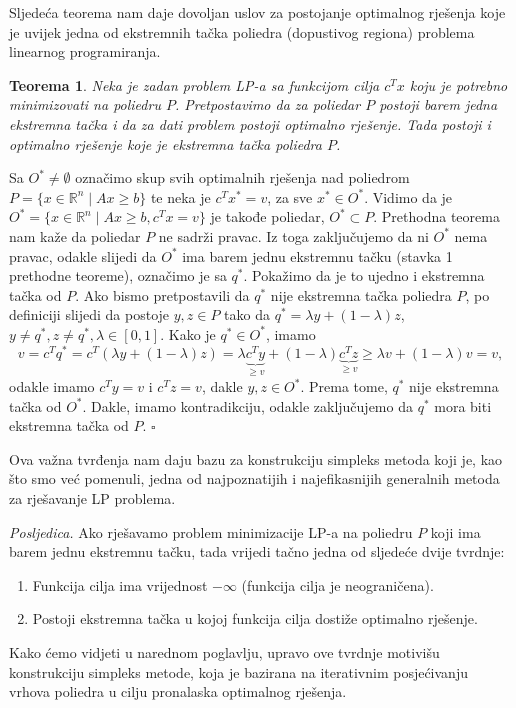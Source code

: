\documentclass[a4paper, utf8, 11pt, colorlinks]{book}
\newtheorem{thm}{Teorema}
\newenvironment{proof}{{Dokaz:}}{\hfill$\square$}
\begin{document}
Sljedeća teorema nam daje dovoljan uslov za postojanje optimalnog rješenja koje je uvijek jedna od ekstremnih tačka poliedra (dopustivog regiona) problema linearnog programiranja.

\begin{thm}
   Neka je zadan problem LP-a sa funkcijom cilja $c^Tx$ koju je potrebno minimizovati na poliedru $P$. Pretpostavimo da za poliedar $P$ postoji barem jedna ekstremna tačka i da za dati problem postoji optimalno rješenje. Tada postoji i optimalno rješenje koje je ekstremna tačka poliedra $P$.
\end{thm}

\begin{proof}
         Sa $O^* \not = \emptyset$ označimo skup svih optimalnih rješenja  nad poliedrom $P= \{ x \in \mathbb{R}^n \mid A x \geq b \}$ te neka je $c^T x^* = v$, za sve $x^* \in O^*$. Vidimo da je 
         $O^* = \{ x \in \mathbb{R}^n \mid A x \geq b, c^T x = v  \}$ je takođe poliedar, $O^* \subset P$. Prethodna teorema nam kaže da poliedar $P$ ne sadrži pravac. Iz toga zaključujemo da ni $O^*$ nema pravac, odakle slijedi da $O^*$ ima barem jednu ekstremnu tačku (stavka 1 prethodne teoreme), označimo je sa $q^*$. Pokažimo da je to ujedno i ekstremna tačka od $P$.  Ako bismo pretpostavili da $q^*$ nije ekstremna tačka poliedra $P$, po definiciji slijedi da postoje $y, z \in P$ tako da $q^* = \lambda y + ( 1 - \lambda ) z $, $y \neq q^*, z \neq q^*, \lambda \in [0, 1]$. Kako je $q^* \in O^*$, imamo 
         $$ v = c^T q^* = c^T (  \lambda y + ( 1 - \lambda ) z ) = \lambda 
        \underbrace{ c^T y}_{ \geq v} + ( 1 - \lambda ) \underbrace{c^T z}_{\geq v} \geq \lambda v + (1 - \lambda) v = v,$$
        odakle imamo $c^T y = v$ i $c^T z = v$, dakle $y, z \in O^*$. Prema tome, $q^*$ nije ekstremna tačka od $O^*$. Dakle, imamo kontradikciju, odakle zaključujemo da $q^*$ mora biti  ekstremna tačka od  $P$.
\end{proof}
 
 Ova važna tvrđenja nam daju bazu za konstrukciju simpleks metoda koji je, kao što smo već pomenuli, jedna od najpoznatijih i najefikasnijih generalnih metoda za rješavanje LP problema.
 
 \emph{Posljedica.} Ako  rješavamo problem minimizacije LP-a na poliedru $P$ koji ima barem jednu ekstremnu tačku, tada vrijedi tačno jedna od sljedeće dvije tvrdnje:
   \begin{enumerate}
       \item Funkcija cilja ima vrijednost $- \infty$ (funkcija cilja je neograničena).
       \item Postoji ekstremna tačka u kojoj funkcija cilja dostiže optimalno rješenje. 
   \end{enumerate}
Kako ćemo vidjeti u narednom poglavlju, upravo  ove tvrdnje motivišu konstrukciju simpleks metode, koja je bazirana na iterativnim posjećivanju vrhova poliedra 
u cilju pronalaska optimalnog rješenja.
\end{document}
